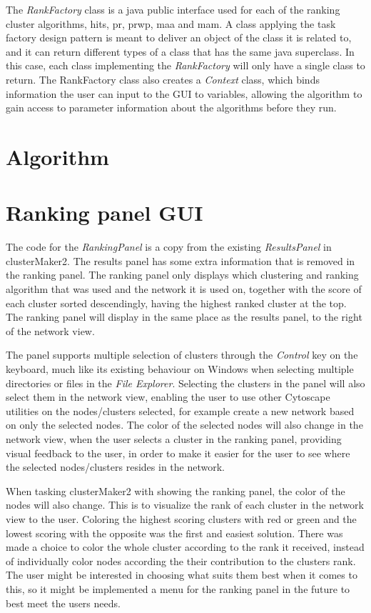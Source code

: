 The \textit{RankFactory} class is a java public interface used for each of the
ranking cluster algorithms, \gls{hits}, \gls{pr}, \gls{prwp}, \gls{maa} and
\gls{mam}. A class applying the task factory design pattern is meant to deliver
an object of the class it is related to\cite{factory-design}, and it can return
different types of a class that has the same java
superclass\cite{java-superclass}. In this case, each class implementing the
\textit{RankFactory} will only have a single class to return. The RankFactory
class also creates a \textit{Context} class, which binds information the user
can input to the GUI to variables, allowing the algorithm to gain access to
parameter information about the algorithms before they run.

\section{Algorithm}
\section{Ranking panel GUI}
The code for the \textit{RankingPanel} is a copy from the existing
\textit{ResultsPanel} in clusterMaker2. The results panel has some extra
information that is removed in the ranking panel. The ranking panel only
displays which clustering and ranking algorithm that was used and the network it
is used on, together with the score of each cluster sorted descendingly, having
the highest ranked cluster at the top. The ranking panel will display in the
same place as the results panel, to the right of the network view.

The panel supports multiple selection of clusters through the \textit{Control}
key on the keyboard, much like its existing behaviour on Windows when selecting
multiple directories or files in the \textit{File Explorer}. Selecting the
clusters in the panel will also select them in the network view, enabling the
user to use other Cytoscape utilities on the nodes/clusters selected, for
example create a new network based on only the selected nodes. The color of the
selected nodes will also change in the network view, when the user selects a
cluster in the ranking panel, providing visual feedback to the user, in order to
make it easier for the user to see where the selected nodes/clusters resides in
the network.

When tasking clusterMaker2 with showing the ranking panel, the color of the
nodes will also change. This is to visualize the rank of each cluster in the
network view to the user. Coloring the highest scoring clusters with red or
green and the lowest scoring with the opposite was the first and easiest
solution. There was made a choice to color the whole cluster according to the
rank it received, instead of individually color nodes according the their
contribution to the clusters rank. The user might be interested in choosing what
suits them best when it comes to this, so it might be implemented a menu for the
ranking panel in the future to best meet the users needs.

